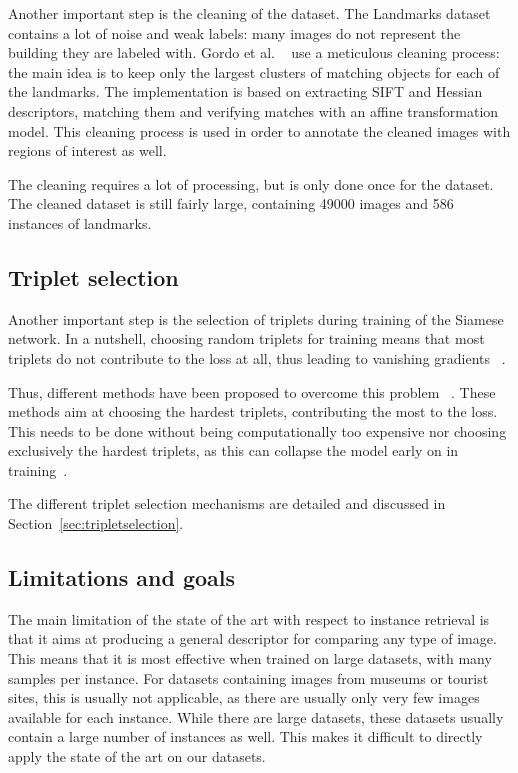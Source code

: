 Another important step is the cleaning of the dataset. The Landmarks
dataset contains a lot of noise and weak labels: many images do not
represent the building they are labeled with. Gordo et al.
~\cite{gordo_end--end_2017} use a meticulous
cleaning process: the main idea is to keep only the largest clusters
of matching objects for each of the landmarks. The implementation is
based on extracting SIFT and Hessian descriptors,
matching them and verifying matches with an affine transformation model.
This cleaning process is used in order to annotate the cleaned images
with regions of interest as well.

The cleaning requires a lot of processing,
but is only done once for the dataset.
The cleaned dataset is still fairly large, containing 49000 images and
586 instances of landmarks.

\subsection{Triplet selection}
Another important step is the selection of triplets during training of
the Siamese network. In a nutshell, choosing random triplets for training means that most triplets do not contribute to the loss at all,
thus leading to vanishing gradients
~\cite{schroff_facenet:_2015,weinberger_distance_2006}.

Thus, different methods have been proposed to overcome this problem
~\cite{gordo_end--end_2017,schroff_facenet:_2015}. These methods
aim at choosing the hardest triplets, contributing the most to the loss.
This needs to be done without being computationally too expensive
nor choosing exclusively the hardest triplets, as this can collapse
the model early on in training~\cite{schroff_facenet:_2015}.

The different triplet selection mechanisms are detailed and discussed
in Section~\ref{sec:tripletselection}.

\subsection{Limitations and goals}\label{sec:limitations}
The main limitation of the state of the art with respect to instance retrieval
is that it aims at producing a general descriptor for comparing any type
of image. This means that it
is most effective when trained on large datasets, with many samples
per instance. For datasets containing images from museums or tourist
sites, this is usually not applicable, as there are usually only very few
images available for each instance. While there are large datasets,
these datasets usually contain a large number of instances as well.
This makes it difficult to directly apply the state of the art on
our datasets.

